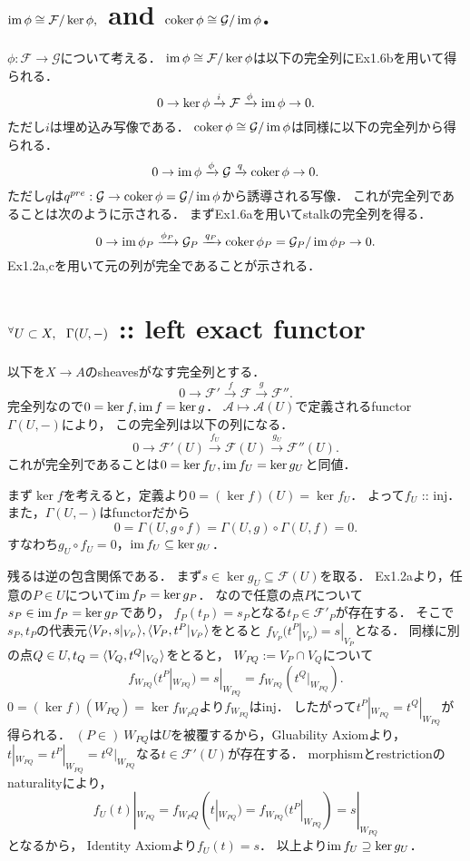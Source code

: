 \documentclass[a4paper]{jsarticle}
\newcommand{\shA}{\mathcal{A}}
\newcommand{\shF}{\mathcal{F}}
\newcommand{\shG}{\mathcal{G}}
\begin{document}
\section{$\im \phi \cong \shF/\ker \phi,$ and $\coker \phi \cong \shG/\im \phi$.} %
    $\phi: \shF \to \shG$について考える．
    $\im \phi \cong \shF/\ker \phi$は以下の完全列にEx1.6bを用いて得られる．
    \[ 0 \to \ker \phi \xrightarrow{i} \shF \xrightarrow{\phi} \im \phi \to 0. \]
    ただし$i$は埋め込み写像である．
    $\coker \phi \cong \shG/\im \phi$は同様に以下の完全列から得られる．
    \[ 0 \to \im \phi \xrightarrow{\phi} \shG \xrightarrow{q} \coker \phi \to 0. \]
    ただし$q$は$q^{pre}: \shG \to \coker \phi=\shG/\im \phi$から誘導される写像．
    これが完全列であることは次のように示される．
    まずEx1.6aを用いてstalkの完全列を得る．
    \[ 0 \to \im \phi_P \xrightarrow{\phi_P} \shG_P \xrightarrow{q_P} \coker \phi_P=\shG_P/\im \phi_P \to 0. \]
    Ex1.2a,cを用いて元の列が完全であることが示される．

\section{${}^{\forall} U \subset X,~~ \Gamma(U,-)$ :: left exact functor} %
    以下を$X \to A$のsheavesがなす完全列とする．
    \[ 0 \to \shF' \xrightarrow{f} \shF \xrightarrow{g} \shF''. \]
    完全列なので$0=\ker f, \operatorname{im} f=\ker g$．
    $\shA \mapsto \shA(U)$で定義されるfunctor $\Gamma(U,-)$により，
    この完全列は以下の列になる．
    \[ 0 \to \shF'(U) \xrightarrow{f_U} \shF(U) \xrightarrow{g_U} \shF''(U). \]
    これが完全列であることは$0=\ker f_U, \operatorname{im} f_U=\ker g_U$と同値．

    まず$\ker f$を考えると，定義より$0=(\ker f)(U)=\ker f_U$．
    よって$f_U$ :: inj．
    また，$\Gamma(U,-)$はfunctorだから
    \[ 0=\Gamma(U,g \circ f)=\Gamma(U,g) \circ \Gamma(U,f)=0. \]
    すなわち$g_U \circ f_U=0$，$\operatorname{im} f_U \subseteq \ker g_U$．

    残るは逆の包含関係である．
    まず$s \in \ker g_U \subseteq \shF(U)$を取る．
    Ex1.2aより，任意の$P \in U$について$\operatorname{im} f_P=\ker g_P$．
    なので任意の点$P$について$s_P \in \operatorname{im} f_P=\ker g_P$であり，
    $f_P(t_P)=s_P$となる$t_P \in \shF'_P$が存在する．
    そこで$s_P,t_P$の代表元$\langle V_P,s|_{V_P} \rangle, \langle V_P,t^P|_{V_P} \rangle$をとると
    $f_{V_P}(t^P|_{V_P})=s|_{V_P}$となる．
    同様に別の点$Q \in U, t_Q=\langle V_Q,t^Q|_{V_Q} \rangle$をとると，
    $W_{PQ}:=V_P \cap V_Q$について
    \[ f_{W_{PQ}}(t^P|_{W_{PQ}})=s|_{W_{PQ}}=f_{W_{PQ}}(t^Q|_{W_{PQ}}). \]
    $0=(\ker f)(W_{PQ})=\ker f_{W_PQ}$より$f_{W_{PQ}}$はinj．
    したがって$t^P|_{W_{PQ}}=t^Q|_{W_{PQ}}$が得られる．
    $(P \in)~W_{PQ}$は$U$を被覆するから，Gluability Axiomより，
    $t|_{W_{PQ}}=t^P|_{W_{PQ}}=t^Q|_{W_{PQ}}$なる$t \in \shF'(U)$が存在する．
    morphismとrestrictionのnaturalityにより，
    \[ f_{U}(t)|_{W_{PQ}}=f_{W_PQ}(t|_{W_{PQ}})=f_{W_{PQ}}(t^P|_{W_{PQ}})=s|_{W_{PQ}} \]となるから，
    Identity Axiomより$f_{U}(t)=s$．
    以上より$\operatorname{im} f_U \supseteq \ker g_U$．
\end{document}
